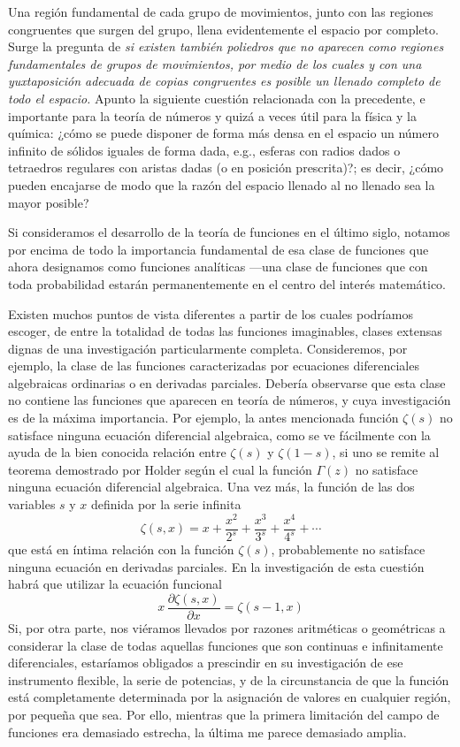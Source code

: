 \documentclass[a4paper, 12pt]{article}
\begin{document}
Una región fundamental de cada grupo de movimientos, junto con las regiones congruentes que surgen del grupo, llena evidentemente el espacio por completo. Surge la pregunta de \textit{si existen también poliedros que no aparecen como regiones fundamentales de grupos de movimientos, por medio de los cuales y con una yuxtaposición adecuada de copias congruentes es posible un llenado completo de todo el espacio.} Apunto la siguiente cuestión relacionada con la precedente, e importante  para la teoría de números y quizá a veces útil para la física y la química: ¿cómo se puede disponer de forma más densa en el espacio un número infinito de sólidos iguales de forma dada, e.g., esferas con radios dados o tetraedros regulares con aristas dadas (o en posición prescrita)?; es decir, ¿cómo pueden encajarse de modo que la razón del espacio llenado al no llenado sea la mayor posible?



Si consideramos el desarrollo de la teoría de funciones en el último siglo, notamos por encima de todo la importancia fundamental de esa clase de funciones que ahora designamos como funciones analíticas ---una clase de funciones que con toda probabilidad estarán permanentemente en el centro del interés matemático.

Existen muchos puntos de vista diferentes a partir de los cuales podríamos escoger, de entre la totalidad de todas las funciones imaginables, clases extensas dignas de una investigación particularmente completa. Consideremos, por ejemplo, la clase de las funciones caracterizadas por ecuaciones diferenciales algebraicas ordinarias o en derivadas parciales. Debería observarse que esta clase no contiene las funciones que aparecen en teoría de números, y cuya investigación es de la máxima importancia. Por ejemplo, la antes mencionada función $\zeta(s)$ no satisface ninguna ecuación diferencial algebraica, como se ve fácilmente con la ayuda de la bien conocida relación entre $\zeta(s)$ y $\zeta(1-s)$, si uno se remite al teorema demostrado por Holder según el cual la función $\Gamma(z)$ no satisface ninguna ecuación diferencial algebraica. Una vez más, la función de las dos variables $s$ y $x$ definida por la serie infinita
$$
\zeta(s,x)=x+ \frac{x^2}{2^s}+\frac{x^3}{3^s}+\frac{x^4}{4^s}+ \cdots
$$
que está en íntima relación con la función $\zeta(s)$, probablemente no satisface ninguna ecuación en derivadas parciales. En la investigación de esta cuestión habrá que utilizar la ecuación funcional
$$
x \,\frac{\partial \zeta(s,x)}{\partial x}= \zeta(s-1,x)
$$
Si, por otra parte, nos viéramos llevados por razones aritméticas o geomé\-tricas a considerar la clase de todas aquellas funciones que son continuas e infinitamente diferenciales, estaríamos obligados a prescindir en su investigación de ese instrumento flexible, la serie de potencias, y de la circunstancia de que la función está completamente determinada por la asignación de valores en cualquier región, por pequeña que sea. Por ello, mientras que la primera limitación del campo de funciones era demasiado estrecha, la última me parece demasiado amplia.
\end{document}
